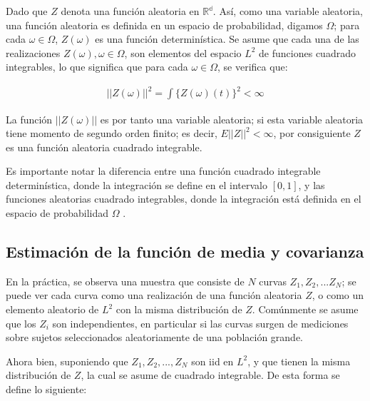 \documentclass[
]{book}
\begin{document}
Dado que \(Z\) denota una función aleatoria en \(\mathbb{R^d}\). Así, como una variable aleatoria, una función aleatoria es definida en un espacio de probabilidad, digamos \(\Omega\); para cada \(\omega \in \Omega\), \(Z(\omega)\) es una función determinística. Se asume que cada una de las realizaciones \(Z(\omega),\omega \in \Omega\), son elementos del espacio \(L^2\) de funciones cuadrado integrables, lo que significa que para cada \(\omega\in \Omega\), se verifica que:

\begin{align*}
    ||Z(\omega)||^2=\int \{ Z(\omega)(t)\}^2<\infty
\end{align*}

La función \(||Z(\omega)||\) es por tanto una variable aleatoria; si esta variable aleatoria tiene momento de segundo orden finito; es decir, \(E||Z||^2<\infty\), por consiguiente \(Z\) es una función aleatoria cuadrado integrable.

Es importante notar la diferencia entre una función cuadrado integrable determinística, donde la integración se define en el intervalo \([0,1]\), y las funciones aleatorias cuadrado integrables, donde la integración está definida en el espacio de probabilidad \(\Omega\) \citep{kokoska}.

\hypertarget{estimaciuxf3n-de-la-funciuxf3n-de-media-y-covarianza}{%
\subsection{\texorpdfstring{\textbf{Estimación de la función de media y covarianza}}{Estimación de la función de media y covarianza}}\label{estimaciuxf3n-de-la-funciuxf3n-de-media-y-covarianza}}

En la práctica, se observa una muestra que consiste de \(N\) curvas \(Z_1,Z_2,...Z_N\); se puede ver cada curva como una realización de una función aleatoria \(Z\), o como un elemento aleatorio de \(L^2\) con la misma distribución de \(Z\). Comúnmente se asume que los \(Z_i\) son independientes, en particular si las curvas surgen de mediciones sobre sujetos seleccionados aleatoriamente de una población grande.

Ahora bien, suponiendo que \(Z_1,Z_2,...,Z_N\) son iid en \(L^2\), y que tienen la misma distribución de \(Z\), la cual se asume de cuadrado integrable. De esta forma se define lo siguiente:
\end{document}
